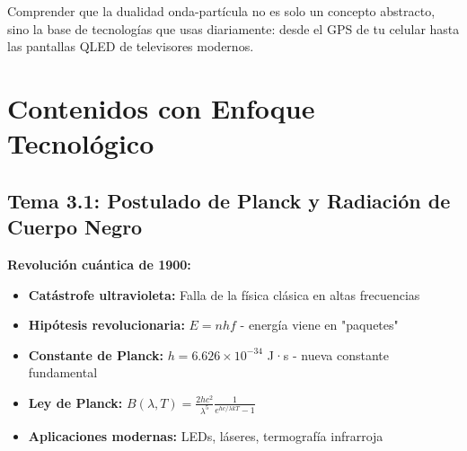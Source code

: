 \begin{tecnologiabox}
\begin{tecnologiabox}
\begin{tecnologiabox}
\begin{teknologiabox}
\begin{objetivobox}
Comprender que la dualidad onda-partícula no es solo un concepto abstracto, sino la base de tecnologías que usas diariamente: desde el GPS de tu celular hasta las pantallas QLED de televisores modernos.
\end{objetivobox}

\section{Contenidos con Enfoque Tecnológico}

\subsection{Tema 3.1: Postulado de Planck y Radiación de Cuerpo Negro}

\begin{saberbox}
\textbf{Revolución cuántica de 1900:}
\begin{itemize}
\item \textbf{Catástrofe ultravioleta:} Falla de la física clásica en altas frecuencias
\item \textbf{Hipótesis revolucionaria:} $E = nhf$ - energía viene en "paquetes"
\item \textbf{Constante de Planck:} $h = 6.626 \times 10^{-34}$ J·s - nueva constante fundamental
\item \textbf{Ley de Planck:} $B(\lambda,T) = \frac{2hc^2}{\lambda^5} \frac{1}{e^{hc/\lambda kT}-1}$
\item \textbf{Aplicaciones modernas:} LEDs, láseres, termografía infrarroja
\end{itemize}
\end{saberbox}

\end{teknologiabox}
\end{tecnologiabox}
\end{tecnologiabox}
\end{tecnologiabox}

